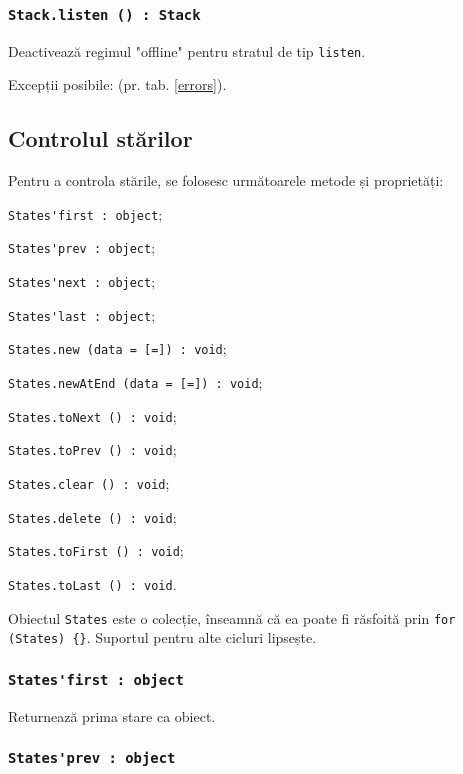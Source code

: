 \subsubsection{\lstinline|Stack.listen () : Stack|}

Deactivează regimul "offline" pentru stratul de tip \lstinline|listen|.

Excepții posibile:  (pr. tab. \ref{errors}).

\subsection{Controlul stărilor}

Pentru a controla stările, se folosesc următoarele metode și proprietăți:
\begin{icItems}
	\item \lstinline|States'first : object|;
	\item \lstinline|States'prev : object|;
	\item \lstinline|States'next : object|;
	\item \lstinline|States'last : object|;
	\item \lstinline|States.new (data = [=]) : void|;
	\item \lstinline|States.newAtEnd (data = [=]) : void|;
	\item \lstinline|States.toNext () : void|;
	\item \lstinline|States.toPrev () : void|;
	\item \lstinline|States.clear () : void|;
	\item \lstinline|States.delete () : void|;
	\item \lstinline|States.toFirst () : void|;
	\item \lstinline|States.toLast () : void|.
\end{icItems}

Obiectul \lstinline|States| este o colecție, înseamnă că ea poate fi răsfoită prin \lstinline|for (States) {}|. Suportul pentru alte cicluri lipsește.

\subsubsection{\lstinline|States'first : object|}

Returnează prima stare ca obiect.

\subsubsection{\lstinline|States'prev : object|}

